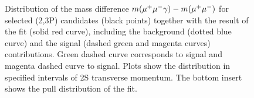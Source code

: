 \begin{figure}[H]
\begin{picture}
  \end{picture}
  \caption {\small
    Distribution of the mass difference $m(\mumu\gamma) - m(\mumu)$ for selected
    \chib(2,3P) candidates (black points) together with the result of the fit
    (solid red curve), including the background (dotted blue curve) and the
    signal (dashed green and magenta curves) contributions. Green dashed curve
    corresponds to \chibone signal and magenta dashed curve to \chibtwo signal.
    Plots show the distribution in specified intervals of \Y2S transverse
    momentum. The bottom insert shows the  pull distribution of the fit.}
  \label{fig:chib-2s:fits}
\end{figure}
